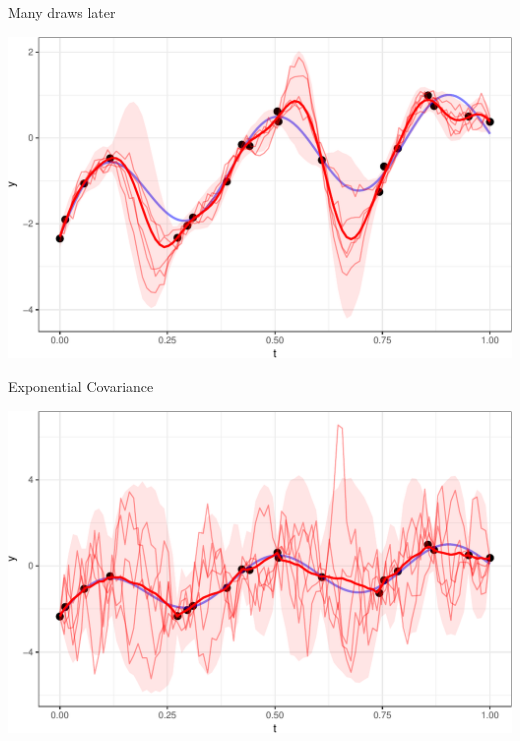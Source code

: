 \documentclass[11pt,ignorenonframetext,]{beamer}
\begin{document}
\begin{frame}{%
\protect\hypertarget{many-draws-later}{%
Many draws later}}

\begin{center}\includegraphics[width=\textwidth]{Lec12_files/figure-beamer/unnamed-chunk-10-1} \end{center}

\end{frame}

\begin{frame}{%
\protect\hypertarget{exponential-covariance}{%
Exponential Covariance}}

\begin{center}\includegraphics[width=\textwidth]{Lec12_files/figure-beamer/unnamed-chunk-11-1} \end{center}

\end{frame}
\end{document}
